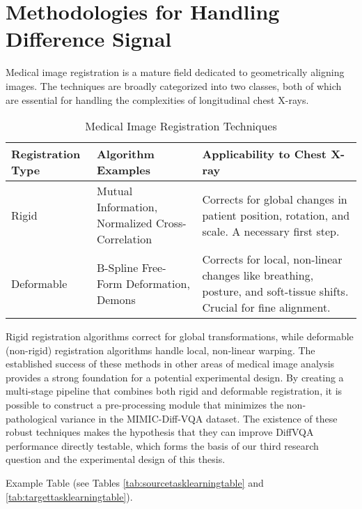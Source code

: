 \section{Methodologies for Handling Difference Signal}
Medical image registration is a mature field dedicated to geometrically aligning images. The techniques are broadly categorized into two classes, both of which are essential for handling the complexities of longitudinal chest X-rays.

\begin{table}[h!]
	\centering
	\caption{Medical Image Registration Techniques}
	\label{tab:registration_techniques}
	\begin{tabular}{|l|l|p{7cm}|}
		\hline
		\textbf{Registration Type} & \textbf{Algorithm Examples} & \textbf{Applicability to Chest X-ray} \\ \hline \hline
		Rigid & Mutual Information, Normalized Cross-Correlation & Corrects for global changes in patient position, rotation, and scale. A necessary first step. \\ \hline
		Deformable & B-Spline Free-Form Deformation, Demons & Corrects for local, non-linear changes like breathing, posture, and soft-tissue shifts. Crucial for fine alignment. \\ \hline
	\end{tabular}
\end{table}

Rigid registration algorithms correct for global transformations, while deformable (non-rigid) registration algorithms handle local, non-linear warping. The established success of these methods in other areas of medical image analysis provides a strong foundation for a potential experimental design. By creating a multi-stage pipeline that combines both rigid and deformable registration, it is possible to construct a pre-processing module that minimizes the non-pathological variance in the MIMIC-Diff-VQA dataset. The existence of these robust techniques makes the hypothesis that they can improve DiffVQA performance directly testable, which forms the basis of our third research question and the experimental design of this thesis.

Example Table (see Tables \ref{tab:sourcetasklearningtable} and \ref{tab:targettasklearningtable}).

